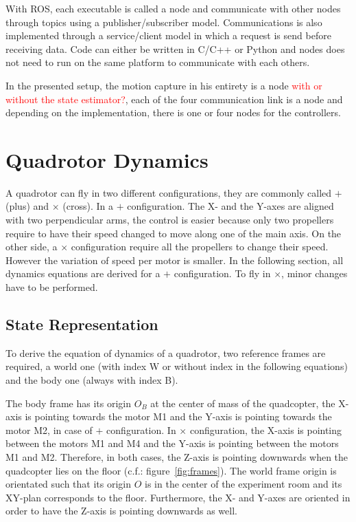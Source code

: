 \documentclass[a4paper, 12pt]{report}
\begin{document}
With ROS, each executable is called a node and communicate with other nodes through topics using a publisher/subscriber model. Communications is also implemented through a service/client model in which a request is send before receiving data. Code can either be written in C/C++ or Python and nodes does not need to run on the same platform to communicate with each others.

In the presented setup, the motion capture in his entirety is a node \textcolor{red}{with or without the state estimator?}, each of the four communication link is a node and depending on the implementation, there is one or four nodes for the controllers.


\newpage
\section{Quadrotor Dynamics}
A quadrotor can fly in two different configurations, they are commonly called $+$ (plus) and $\times$ (cross). In a $+$ configuration. The X- and the Y-axes are aligned with two perpendicular arms, the control is easier because only two propellers require to have their speed changed to move along one of the main axis. On the other side, a $\times$ configuration require all the propellers to change their speed. However the variation of speed per motor is smaller. In the following section, all dynamics equations are derived for a $+$ configuration. To fly in $\times$, minor changes have to be performed.

\subsection{State Representation}
To derive the equation of dynamics of a quadrotor, two reference frames are required, a world one (with index W or without index in the following equations) and the body one (always with index B).

 The body frame has its origin $O_B$ at the center of mass of the quadcopter, the X-axis is pointing towards the motor M1 and the Y-axis is pointing towards the motor M2, in case of $+$ configuration. In $\times$ configuration, the X-axis is pointing between the motors M1 and M4 and the Y-axis is pointing between the motors M1 and M2. Therefore, in both cases, the Z-axis is pointing downwards when the quadcopter lies on the floor (c.f.: figure~\ref{fig:frames}). 
The world frame origin is orientated such that its origin $O$ is in the center of the experiment room and its XY-plan corresponds to the floor. Furthermore, the X- and Y-axes are oriented in order to have the Z-axis is pointing downwards as well. 
\end{document}
